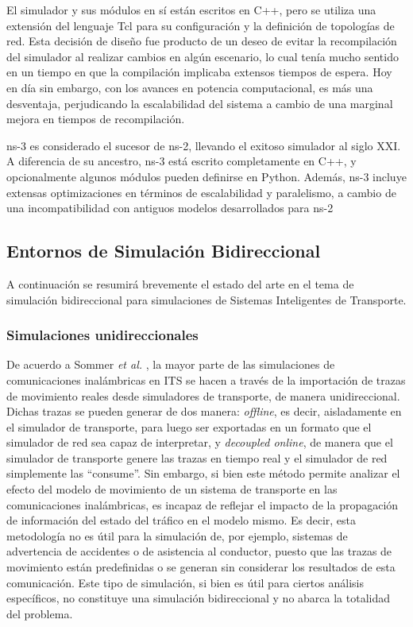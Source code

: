 El simulador y sus módulos en sí están escritos en C++, pero se utiliza una extensión del lenguaje Tcl para su configuración y la definición de topologías de red. Esta decisión de diseño fue producto de un deseo de evitar la recompilación del simulador al realizar cambios en algún escenario, lo cual tenía mucho sentido en un tiempo en que la compilación implicaba extensos tiempos de espera. Hoy en día sin embargo, con los avances en potencia computacional, es más una desventaja, perjudicando la escalabilidad del sistema \autocite{perf_comp_recentnetworksims} a cambio de una marginal mejora en tiempos de recompilación. 

ns-3 es considerado el sucesor de ns-2, llevando el exitoso simulador al siglo XXI. A diferencia de su ancestro, ns-3 está escrito completamente en C++, y opcionalmente algunos módulos pueden definirse en Python. Además, ns-3 incluye extensas optimizaciones en términos de escalabilidad y paralelismo, a cambio de una incompatibilidad con antiguos modelos desarrollados para ns-2

\subsection{Entornos de Simulación Bidireccional}

A continuación se resumirá brevemente el estado del arte en el tema de simulación bidireccional para simulaciones de Sistemas Inteligentes de Transporte. 

\subsubsection{Simulaciones unidireccionales}

De acuerdo a Sommer \emph{et al.} \autocite{bidirectionalsimul}, la mayor parte de las simulaciones de comunicaciones inalámbricas en ITS se hacen a través de la importación de trazas de movimiento reales desde simuladores de transporte, de manera unidireccional. Dichas trazas se pueden generar de dos manera: \textit{offline}, es decir, aisladamente en el simulador de transporte, para luego ser exportadas en un formato que el simulador de red sea capaz de interpretar, y \textit{decoupled online}, de manera que el simulador de transporte genere las trazas en tiempo real y el simulador de red simplemente las ``consume''. Sin embargo, si bien este método permite analizar el efecto del modelo de movimiento de un sistema de transporte en las comunicaciones inalámbricas, es incapaz de reflejar el impacto de la propagación de información del estado del tráfico en el modelo mismo. Es decir, esta metodología no es útil para la simulación de, por ejemplo, sistemas de advertencia de accidentes o de asistencia al conductor, puesto que las trazas de movimiento están predefinidas o se generan sin considerar los resultados de esta comunicación. Este tipo de simulación, si bien es útil para ciertos análisis específicos, no constituye una simulación bidireccional y no abarca la totalidad del problema.


